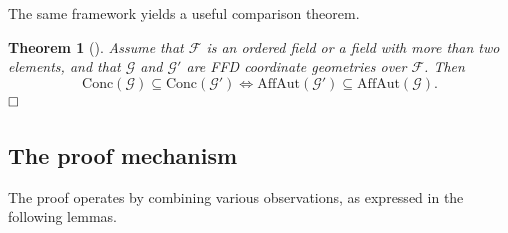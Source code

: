 \documentclass[11pt,a4paper]{article}
\newtheorem{theorem}{Theorem}[section]
\theoremstyle{definition}
\begin{document}
\label{sec:4.2}

The same framework yields a useful comparison theorem.

\begin{theorem}[{\cite[Theorem~4.5(ii)]{MSS26}}]
\label{thm:4.2}
Assume that $\mathcal{F}$ is an ordered field or a field with
more than two elements, and that $\mathcal{G}$ and $\mathcal{G}'$ are
FFD coordinate geometries over $\mathcal{F}$. Then 
\[
\mathrm{Conc}(\mathcal{G}) \subseteq \mathrm{Conc}(\mathcal{G}')
    \Longleftrightarrow
\mathrm{AffAut}(\mathcal{G}') \subseteq \mathrm{AffAut}(\mathcal{G}).
\]
$\hfill \Box$
\end{theorem}


\subsection{The proof mechanism}
\label{sec:4.2}


The proof operates by combining various observations, as expressed in the following lemmas.
\end{document}
